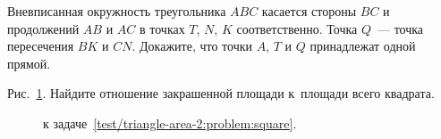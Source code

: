 \begin{problems}
\item
\label{test/triangle-area-2:problem:exscribed}%
Вневписанная окружность треугольника $ABC$ касается стороны $BC$ и продолжений
$AB$ и $AC$ в точках $T$, $N$, $K$ соответственно.
Точка $Q$~--- точка пересечения $BK$ и $CN$.
Докажите, что точки $A$, $T$ и $Q$ принадлежат одной прямой.

\item
\label{test/triangle-area-2:problem:square}%
Рис.~\ref{test/triangle-area-2:problem:square:fig}.
Найдите отношение закрашенной площади к~площади всего квадрата.

\begin{figure}[hp]
\begin{center}
    \caption{к задаче~\ref{test/triangle-area-2:problem:square}.}
    \label{test/triangle-area-2:problem:square:fig}
\end{center}
\end{figure}

%

\end{problems}

